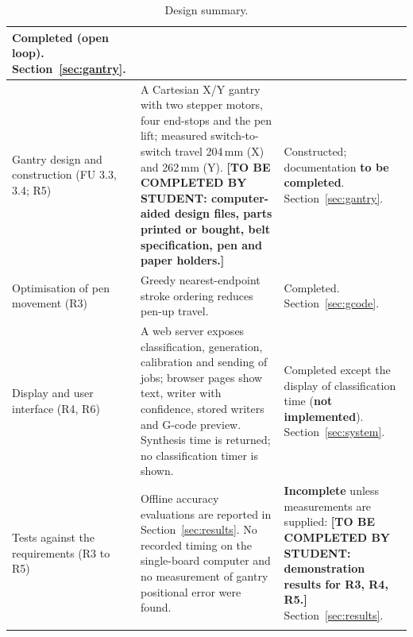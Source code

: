 {\begin{longtable}{|p{3.3cm}|p{7.0cm}|p{4.3cm}|}
Completed (open loop). Section~\ref{sec:gantry}. \\
\hline
Gantry design and construction (FU 3.3, 3.4; R5) &
A Cartesian X/Y gantry with two stepper motors, four end-stops and the pen lift; measured switch-to-switch travel 204\,mm (X) and 262\,mm (Y). \textbf{[TO BE COMPLETED BY STUDENT: computer-aided design files, parts printed or bought, belt specification, pen and paper holders.]} &
Constructed; documentation \textbf{to be completed}. Section~\ref{sec:gantry}. \\
\hline
Optimisation of pen movement (R3) &
Greedy nearest-endpoint stroke ordering reduces pen-up travel. &
Completed. Section~\ref{sec:gcode}. \\
\hline
Display and user interface (R4, R6) &
A web server exposes classification, generation, calibration and sending of jobs; browser pages show text, writer with confidence, stored writers and G-code preview. Synthesis time is returned; no classification timer is shown. &
Completed except the display of classification time (\textbf{not implemented}). Section~\ref{sec:system}. \\
\hline
Tests against the requirements (R3 to R5) &
Offline accuracy evaluations are reported in Section~\ref{sec:results}. No recorded timing on the single-board computer and no measurement of gantry positional error were found. &
\textbf{Incomplete} unless measurements are supplied: \textbf{[TO BE COMPLETED BY STUDENT: demonstration results for R3, R4, R5.]} Section~\ref{sec:results}. \\
\caption{Design summary.}
\label{tab:des-summary}
\end{longtable}
}
